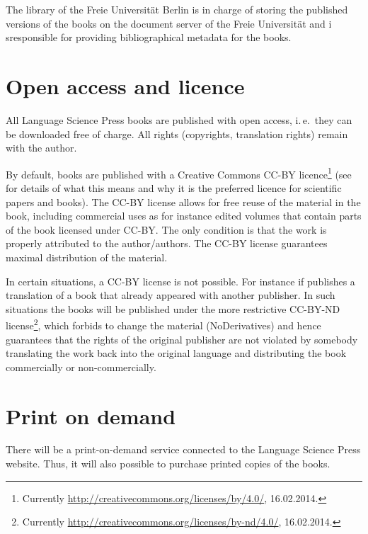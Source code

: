 The library of the Freie Universität Berlin is in charge of storing the published versions of the
books on the document server of the Freie Universität and i sresponsible for providing
bibliographical metadata for the books. 




\section{Open access and licence}

All Language Science Press books are published with open access, i.\,e.\ they can be downloaded free of
charge. All rights (copyrights, translation rights) remain with the author. 

By default, \lsp books are published with a Creative Commons CC-BY licence\footnote{ 
  Currently \url{http://creativecommons.org/licenses/by/4.0/}, 16.02.2014.
} (see  for details
of what this means and why it is the preferred licence for scientific papers and books). The CC-BY
license allows for free reuse of the material in the book, including commercial uses as for instance
edited volumes that contain parts of the book licensed under CC-BY. The only condition is that the
work is properly attributed to the author/authors. The CC-BY license guarantees maximal distribution
of the material.

In certain situations, a CC-BY license is not possible. For instance if \lsp publishes a translation of a
book that already appeared with another publisher. In such situations the books will be published
under the more restrictive CC-BY-ND license\footnote{
Currently \url{http://creativecommons.org/licenses/by-nd/4.0/}, 16.02.2014.
}, which forbids to change the material (NoDerivatives) and hence guarantees that
the rights of the original publisher are not violated by somebody translating the work back into the
original language and distributing the book commercially or non-commercially.




\section{Print on demand}

There will be a print-on-demand service connected to the Language Science Press website. Thus, it will also possible to purchase printed copies of the books.



